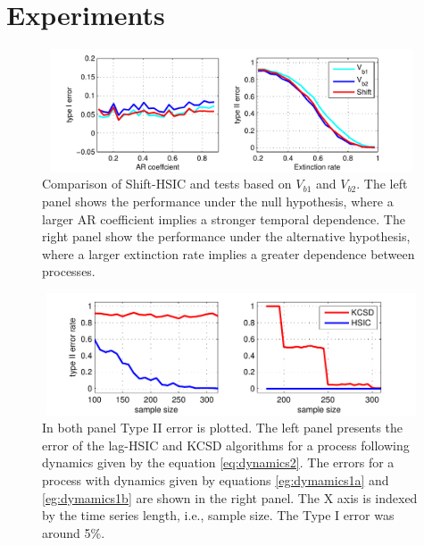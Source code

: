 \section{Experiments}
\label{sec:Experiments}



\begin{figure}
\centering  
\includegraphics[width=397.5pt,height=102.5pt]{./imgNips14/arExtinct.pdf}
\caption{Comparison of Shift-HSIC and tests based on $V_{b1}$ and $V_{b2}$. The left panel shows the performance under the null hypothesis, where a larger AR coefficient implies a stronger temporal dependence. The right panel show the performance under the alternative hypothesis, where a larger extinction rate implies a greater dependence between processes.}
\label{fig:arExtinct}
\end{figure}

\begin{figure}
\centering  
\includegraphics[width=397.5pt,height=102.5pt]{./imgNips14/varAndPhase.pdf}
\caption{In both panel Type II error is plotted. The left panel presents the error of the lag-HSIC and KCSD algorithms for a process following dynamics given by the equation \eqref{eq:dynamics2}.  The errors for a process with dynamics given by equations \eqref{eg:dymamics1a} and \eqref{eg:dymamics1b} are shown in the right panel. The X axis is indexed by the time series length, i.e., sample size. The Type I error was around 5\%.}
\label{fig:phaseAndVar}
\end{figure}

\vspace{-4mm}
